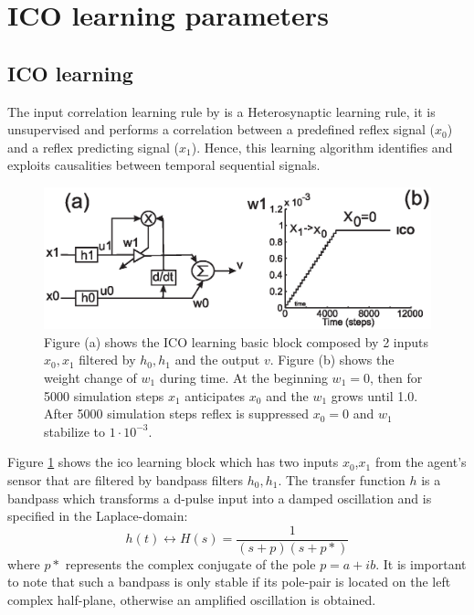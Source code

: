 
\section{ICO learning parameters}
\label{app:appendixICO}

\subsection{ICO learning}
The input correlation learning rule by \citet{Porr2006ICO} is a Heterosynaptic
learning rule, it is unsupervised and performs a correlation between a predefined reflex signal
($x_{0}$) and a reflex predicting signal ($x_{1}$). Hence, this learning
algorithm identifies and exploits causalities between temporal
sequential signals.

\begin{figure}[htbp]
\begin{center}
\includegraphics[scale=0.5]{figures/socialadapt/ico.eps}
\caption[Agent learns with the ICO learning]{Figure (a) shows the ICO learning basic
block composed by 2 inputs $x_{0},x_{1}$ filtered by $h_{0},h_{1}$ and the output $v$.
Figure (b) shows the weight change of $w_{1}$ during time. At the beginning $w_{1}=0$,
then for 5000 simulation steps $x_{1}$ anticipates $x_{0}$ and the $w_{1}$ grows until 1.0.
After 5000 simulation steps reflex is suppressed $x_{0}=0$ and $w_{1}$ stabilize to $1 \cdot 10^{-3}$.
\label{fig:appendix.ICO}}
\end{center}
\end{figure}

Figure \ref{fig:appendix.ICO} shows the ico learning block which has two inputs $x_{0}$,$x_{1}$
from the agent's sensor that are filtered by bandpass filters $h_{0},h_{1}$.
The transfer function $h$ is a bandpass which transforms
a d-pulse input into a damped oscillation and is specified in the
Laplace-domain:
\begin{equation}
h(t) \leftrightarrow H(s) =\frac{1}{(s+p)(s+p*)}
\end{equation}
where $p*$ represents the complex conjugate of the pole $p = a + ib$. It is
important to note that such a bandpass is only stable if its pole-pair is
located on the left complex half-plane, otherwise an amplified oscillation is
obtained.


